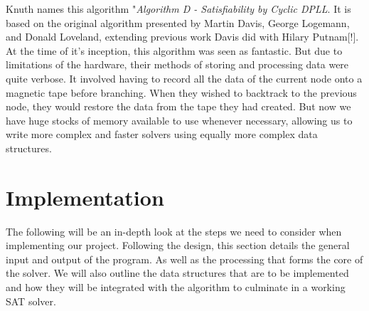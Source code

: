 \documentclass{article}
\begin{document}
Knuth names this algorithm "\textit{Algorithm D - Satisfiability by Cyclic DPLL}. It is based on the
original algorithm presented by Martin Davis, George Logemann, and Donald Loveland\cite{dpll},
extending previous work Davis did with Hilary Putnam[!]. At the time of it's inception, this
algorithm was seen as fantastic. But due to limitations of the hardware, their methods of storing
and processing data were quite verbose. It involved having to record all the data of the current
node onto a magnetic tape before branching. When they wished to backtrack to the previous node,
they would restore the data from the tape they had created. But now we have huge stocks of memory
available to use whenever necessary, allowing us to write more complex and faster solvers using
equally more complex data structures.



\section{Implementation}

The following will be an in-depth look at the steps we need to consider when implementing our
project. Following the design, this section details the general input and output of the program. As
well as the processing that forms the core of the solver. We will also outline the data structures
that are to be implemented and how they will be integrated with the algorithm to culminate in a
working SAT solver.
\end{document}
